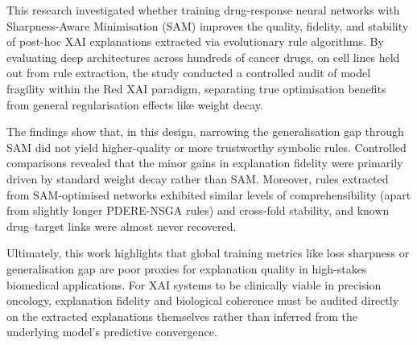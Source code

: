 \label{sec:conclusion}

This research investigated whether training drug-response neural networks with Sharpness-Aware Minimisation (SAM) improves the quality, fidelity, and stability of post-hoc XAI explanations extracted via evolutionary rule algorithms. By evaluating deep architectures across hundreds of cancer drugs, on cell lines held out from rule extraction, the study conducted a controlled audit of model fragility within the Red XAI paradigm, separating true optimisation benefits from general regularisation effects like weight decay.

The findings show that, in this design, narrowing the generalisation gap through SAM did not yield higher-quality or more trustworthy symbolic rules. Controlled comparisons revealed that the minor gains in explanation fidelity were primarily driven by standard weight decay rather than SAM. Moreover, rules extracted from SAM-optimised networks exhibited similar levels of comprehensibility (apart from slightly longer PDERE-NSGA rules) and cross-fold stability, and known drug--target links were almost never recovered.

Ultimately, this work highlights that global training metrics like loss sharpness or generalisation gap are poor proxies for explanation quality in high-stakes biomedical applications. For XAI systems to be clinically viable in precision oncology, explanation fidelity and biological coherence must be audited directly on the extracted explanations themselves rather than inferred from the underlying model's predictive convergence.